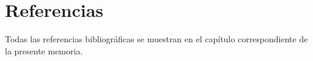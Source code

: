 \section{Referencias}

Todas las referencias bibliográficas se muestran en el capítulo correspondiente de la presente memoria.